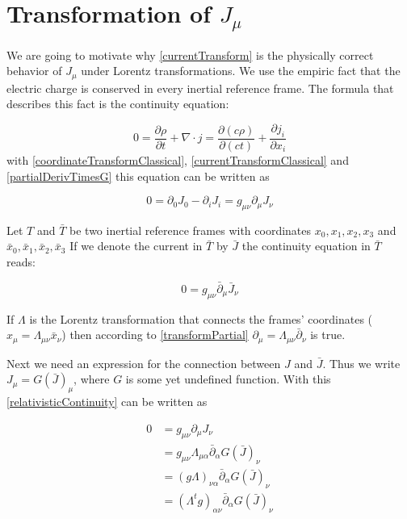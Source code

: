 \documentclass{article}
\begin{document}
\appendix

\section{Transformation of $J_\mu$} \label{appendixConinuity}


We are going to motivate why \ref{currentTransform} is the physically correct behavior of $J_\mu$ under Lorentz transformations.
We use the empiric fact that the electric charge is conserved in every inertial reference frame.
The formula that describes this fact is the continuity equation:

\begin{equation}
    0 = \frac{\partial \rho}{\partial t} + \nabla \cdot j = \frac{\partial (c \rho)}{\partial (ct)} + \frac{\partial j_i}{\partial x_i}
\end{equation}
with \ref{coordinateTransformClassical}, \ref{currentTransformClassical} and \ref{partialDerivTimesG} this equation can be written as

\begin{equation} \label{relativisticContinuity}
    0 = \partial_0 J_0 - \partial_i J_i = g_{\mu\nu} \partial_\mu J_{\nu}
\end{equation}


Let $T$ and $\bar{T}$ be two inertial reference frames with coordinates $x_0, x_1, x_2, x_3$ and $\bar{x}_0, \bar{x}_1, \bar{x}_2, \bar{x}_3$
If we denote the current in $\bar{T}$ by $\bar{J}$ the continuity equation in $\bar{T}$ reads:

\begin{equation} \label{relativisticContinuityTransfored}
    0 = g_{\mu\nu} \bar{\partial}_\mu \bar{J}_{\nu}
\end{equation}

If $\Lambda$ is the Lorentz transformation that connects the frames' coordinates ($x_\mu = \Lambda_{\mu\nu} \bar{x}_\nu$) then according to \ref{transformPartial}
$\partial_\mu = \Lambda_{\mu\nu} \bar{\partial}_\nu$ is true.

Next we need an expression for the connection between $J$ and $\bar{J}$.
Thus we write $J_\mu=G(\bar{J})_\mu$, where $G$ is some yet undefined function.
With this \ref{relativisticContinuity} can be written as

\begin{align} \label{continuityTransformed}
0 & =  g_{\mu\nu} \partial_\mu J_{\nu} \nonumber \\
  & = g_{\mu\nu} \Lambda_{\mu\alpha} \bar{\partial}_\alpha  G(\bar{J})_\nu \nonumber \\
  & = (g \Lambda)_{\nu\alpha} \bar{\partial}_\alpha  G(\bar{J})_\nu \nonumber \\
  & = (\Lambda^t g )_{\alpha\nu} \bar{\partial}_\alpha  G(\bar{J})_\nu \nonumber \\
\end{align}
\end{document}

